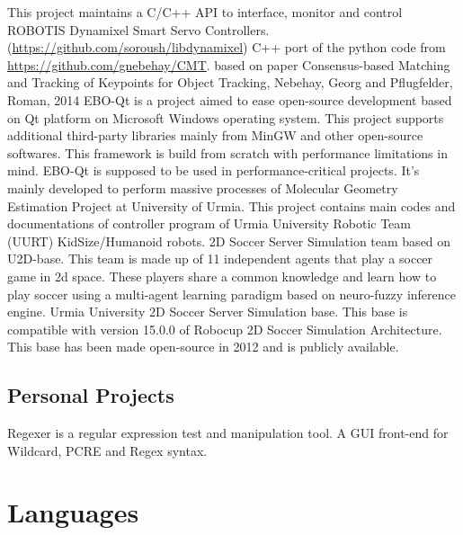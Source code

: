 \documentclass[11pt,a4paper,sans]{moderncv}        %
\begin{document}
{This project maintains a C/C++ API to interface, monitor and control ROBOTIS
Dynamixel Smart Servo Controllers. (\hyperref[https://github.com/soroush/libdynamixel]{https://github.com/soroush/libdynamixel})}
{C++ port of the python code from \href{https://github.com/gnebehay/CMT}{https://github.com/gnebehay/CMT}.
based on paper Consensus-based Matching and Tracking of Keypoints for Object Tracking,
Nebehay, Georg and Pflugfelder, Roman, 2014}
{EBO-Qt is a project aimed to ease open-source development based on Qt platform on
Microsoft Windows operating system. This project supports additional third-party libraries
mainly from MinGW and other open-source softwares.
This framework is build from scratch with performance limitations in mind. EBO-Qt is
supposed to be used in performance-critical projects. It’s mainly developed to perform
massive processes of Molecular Geometry Estimation Project at University of Urmia.}
{This project contains main codes and documentations of controller program of Urmia
University Robotic Team (UURT) KidSize/Humanoid robots.}
{2D Soccer Server Simulation team based on U2D-base. This team is made up of 11 independent agents
that play a soccer game in 2d space. These players share a common knowledge and learn how to play soccer using a
multi-agent learning paradigm based on neuro-fuzzy inference engine.}
{Urmia University 2D Soccer Server Simulation base. This base is compatible with version
15.0.0 of Robocup 2D Soccer Simulation Architecture. This base has been made open-source in 2012 and
is publicly available.}
\subsection{Personal Projects}
{Regexer is a regular expression test and manipulation tool. A GUI front-end for Wildcard,
PCRE and Regex syntax.}
\clearpage
\section{Languages}
\end{document}

